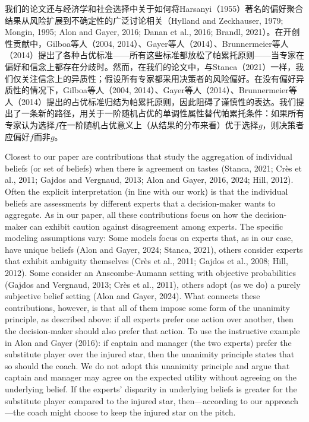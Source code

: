 \documentclass[12pt,a4paper]{article}
\newenvironment{original}
  {\par\noindent\ignorespaces}
  {\par}
\newenvironment{translation}
  {\par\noindent{\color{transblue}\ignorespaces}}
  {\par\medskip}
\begin{document}
\begin{translation}
我们的论文还与经济学和社会选择中关于如何将Harsanyi（1955）著名的偏好聚合结果从风险扩展到不确定性的广泛讨论相关（Hylland and Zeckhauser, 1979; Mongin, 1995; Alon and Gayer, 2016; Danan et al., 2016; Brandl, 2021）。在开创性贡献中，Gilboa等人（2004, 2014）、Gayer等人（2014）、Brunnermeier等人（2014）提出了各种占优标准——所有这些标准都放松了帕累托原则——当专家在偏好和信念上都存在分歧时。然而，在我们的论文中，与Stanca（2021）一样，我们仅关注信念上的异质性；假设所有专家都采用决策者的风险偏好。在没有偏好异质性的情况下，Gilboa等人（2004, 2014）、Gayer等人（2014）、Brunnermeier等人（2014）提出的占优标准归结为帕累托原则，因此阻碍了谨慎性的表达。我们提出了一条新的路径，用关于一阶随机占优的单调性属性替代帕累托条件：如果所有专家认为选择$f$在一阶随机占优意义上（从结果的分布来看）优于选择$g$，则决策者应偏好$f$而非$g$。
\end{translation}

\begin{original}
Closest to our paper are contributions that study the aggregation of individual beliefs (or set of beliefs) when there is agreement on tastes (Stanca, 2021; Cr\`{e}s et al., 2011; Gajdos and Vergnaud, 2013; Alon and Gayer, 2016, 2024; Hill, 2012). Often the explicit interpretation (in line with our work) is that the individual beliefs are assessments by different experts that a decision-maker wants to aggregate. As in our paper, all these contributions focus on how the decision-maker can exhibit caution against disagreement among experts. The specific modeling assumptions vary: Some models focus on experts that, as in our case, have unique beliefs (Alon and Gayer, 2024; Stanca, 2021), others consider experts that exhibit ambiguity themselves (Cr\`{e}s et al., 2011; Gajdos et al., 2008; Hill, 2012). Some consider an Anscombe-Aumann setting with objective probabilities (Gajdos and Vergnaud, 2013; Cr\`{e}s et al., 2011), others adopt (as we do) a purely subjective belief setting (Alon and Gayer, 2024). What connects these contributions, however, is that all of them impose some form of the unanimity principle, as described above: if all experts prefer one action over another, then the decision-maker should also prefer that action. To use the instructive example in Alon and Gayer (2016): if captain and manager (the two experts) prefer the substitute player over the injured star, then the unanimity principle states that so should the coach. We do not adopt this unanimity principle and argue that captain and manager may agree on the expected utility without agreeing on the underlying belief. If the experts' disparity in underlying beliefs is greater for the substitute player compared to the injured star, then---according to our approach---the coach might choose to keep the injured star on the pitch.
\end{original}
\end{document}
